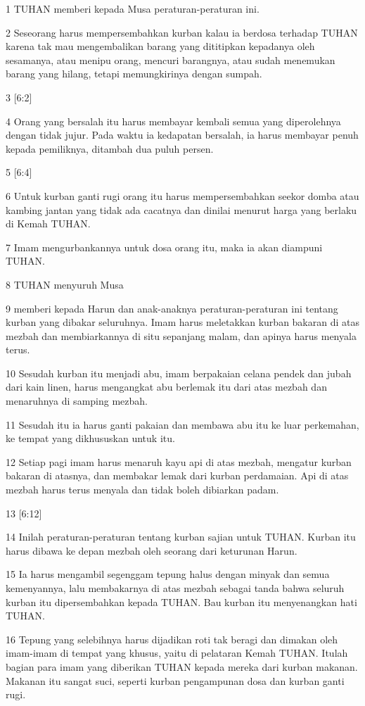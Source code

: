 \par 1 TUHAN memberi kepada Musa peraturan-peraturan ini.
\par 2 Seseorang harus mempersembahkan kurban kalau ia berdosa terhadap TUHAN karena tak mau mengembalikan barang yang dititipkan kepadanya oleh sesamanya, atau menipu orang, mencuri barangnya, atau sudah menemukan barang yang hilang, tetapi memungkirinya dengan sumpah.
\par 3 [6:2]
\par 4 Orang yang bersalah itu harus membayar kembali semua yang diperolehnya dengan tidak jujur. Pada waktu ia kedapatan bersalah, ia harus membayar penuh kepada pemiliknya, ditambah dua puluh persen.
\par 5 [6:4]
\par 6 Untuk kurban ganti rugi orang itu harus mempersembahkan seekor domba atau kambing jantan yang tidak ada cacatnya dan dinilai menurut harga yang berlaku di Kemah TUHAN.
\par 7 Imam mengurbankannya untuk dosa orang itu, maka ia akan diampuni TUHAN.
\par 8 TUHAN menyuruh Musa
\par 9 memberi kepada Harun dan anak-anaknya peraturan-peraturan ini tentang kurban yang dibakar seluruhnya. Imam harus meletakkan kurban bakaran di atas mezbah dan membiarkannya di situ sepanjang malam, dan apinya harus menyala terus.
\par 10 Sesudah kurban itu menjadi abu, imam berpakaian celana pendek dan jubah dari kain linen, harus mengangkat abu berlemak itu dari atas mezbah dan menaruhnya di samping mezbah.
\par 11 Sesudah itu ia harus ganti pakaian dan membawa abu itu ke luar perkemahan, ke tempat yang dikhususkan untuk itu.
\par 12 Setiap pagi imam harus menaruh kayu api di atas mezbah, mengatur kurban bakaran di atasnya, dan membakar lemak dari kurban perdamaian. Api di atas mezbah harus terus menyala dan tidak boleh dibiarkan padam.
\par 13 [6:12]
\par 14 Inilah peraturan-peraturan tentang kurban sajian untuk TUHAN. Kurban itu harus dibawa ke depan mezbah oleh seorang dari keturunan Harun.
\par 15 Ia harus mengambil segenggam tepung halus dengan minyak dan semua kemenyannya, lalu membakarnya di atas mezbah sebagai tanda bahwa seluruh kurban itu dipersembahkan kepada TUHAN. Bau kurban itu menyenangkan hati TUHAN.
\par 16 Tepung yang selebihnya harus dijadikan roti tak beragi dan dimakan oleh imam-imam di tempat yang khusus, yaitu di pelataran Kemah TUHAN. Itulah bagian para imam yang diberikan TUHAN kepada mereka dari kurban makanan. Makanan itu sangat suci, seperti kurban pengampunan dosa dan kurban ganti rugi.
